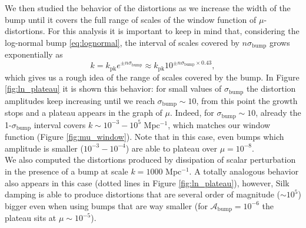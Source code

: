 We then studied the behavior of the distortions as we increase the width of the bump until it covers the full range of scales of the window function of $\mu$-distortions. For this analysis it is important to keep in mind that, considering the log-normal bump \eqref{eq:lognormal}, the interval of scales covered by $n\sigma_\text{bump}$ grows exponentially as
$$k=k_\text{pk}e^{\pm n\sigma_\text{bump}}\approx k_\text{pk}10^{\pm n\sigma_\text{bump}\times 0.43},$$
which gives us a rough idea of the range of scales covered by the bump. In Figure \ref{fig:ln_plateau} it is shown this behavior: for small values of $\sigma_\text{bump}$ the distortion amplitudes keep increasing until we reach $\sigma_\text{bump}\sim10$, from this point the growth stops and a plateau appears in the graph of $\mu$. Indeed, for $\sigma_\text{bump}\sim10$, already the 1-$\sigma_\text{bump}$ interval covers $k\sim 10^{-3}-10^{5}$ Mpc$^{-1}$, which matches our window function (Figure \ref{fig:mu_window}). Note that in this case, even bumps which amplitude is smaller ($10^{-3}-10^{-4}$) are able to plateau over $\mu=10^{-8}$.\\
We also computed the distortions produced by dissipation of scalar perturbation in the presence of a bump at scale $k=1000$ Mpc$^{-1}$. A totally analogous behavior also appears in this case (dotted lines in Figure \ref{fig:ln_plateau}), however, Silk damping is able to produce distortions that are several order of magnitude ($\sim10^5$) bigger even when using bumps that are way smaller (for $\mathcal A_\text{bump}=10^{-6}$ the plateau sits at $\mu\sim 10^{-5}$).

